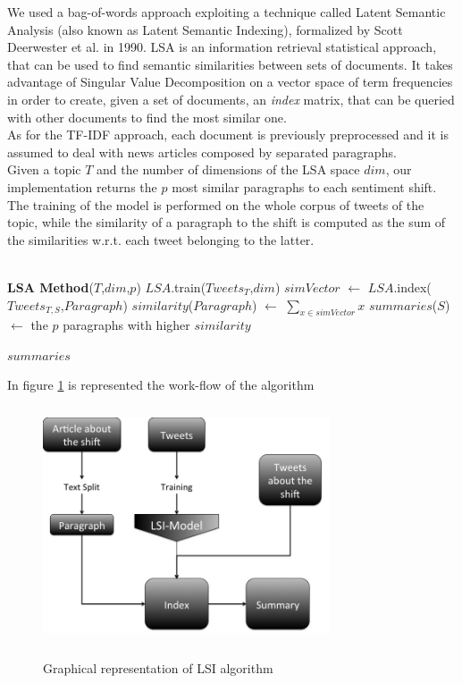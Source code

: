 We used a bag-of-words approach exploiting a technique called Latent Semantic Analysis (also known as Latent Semantic Indexing), formalized by Scott Deerwester et al. in 1990\cite{LSA}. LSA is an information retrieval statistical approach, that can be used to find semantic similarities between sets of documents. It takes advantage of Singular Value Decomposition on a vector space of term frequencies in order to create, given a set of documents, an \emph{index} matrix, that can be queried with other documents to find the most similar one.
\\
As for the TF-IDF approach, each document is previously preprocessed and it is assumed to deal with news articles composed by separated paragraphs.
\\
Given a topic $T$ and the number of dimensions of the LSA space $dim$, our implementation returns the $p$ most similar paragraphs to each sentiment shift. The training of the model is performed on the whole corpus of tweets of the topic, while the similarity of a paragraph to the shift is computed as the sum of the similarities w.r.t. each tweet belonging to the latter.
\\\\
\begin{algorithmic}
\STATE \textbf{LSA Method}($T$,$dim$,$p$)
\STATE
\STATE $LSA$.train($Tweets_T$,$dim$)
\STATE
{}
			\STATE $simVector$ $\leftarrow$ $LSA$.index($Tweets_{T,S}$,$Paragraph$)
			\STATE $similarity$($Paragraph$) $\leftarrow$ $\sum_{x \in simVector} x $
		\ENDFOR
	\ENDFOR
	\STATE $summaries$($S$) $\leftarrow$ the $p$ paragraphs with higher $similarity$

\ENDFOR
\STATE
\RETURN $summaries$

In figure \ref{fig:LSI} is represented the work-flow of the algorithm 

\begin{figure}[htbp]
	\centering
			{\includegraphics[width=8.5cm,height=7cm]{image/LSI.jpg}}	
		\caption[LSI]{Graphical representation of LSI algorithm}
	\label{fig:LSI}
\end{figure} 

\end{algorithmic}
